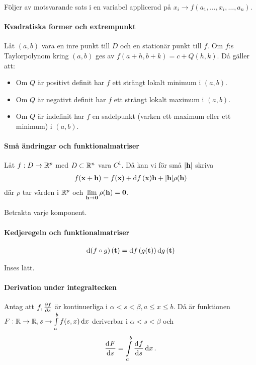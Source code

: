 \proof
Följer av motsvarande sats i en variabel applicerad på $x_i\to f(a_1, \dots, x_i, \dots, a_n)$.

\paragraph{Kvadratiska former och extrempunkt}
Låt $(a, b)$ vara en inre punkt till $D$ och en stationär punkt till $f$. Om $f$:s Taylorpolynom kring $(a, b)$ ges av $f(a + h, b + k) = c + Q(h, k)$. Då gäller att:
\begin{itemize}
	\item Om $Q$ är positivt definit har $f$ ett strängt lokalt minimum i $(a, b)$.
	\item Om $Q$ är negativt definit har $f$ ett strängt lokalt maximum i $(a, b)$.
	\item Om $Q$ är indefinit har $f$ en sadelpunkt (varken ett maximum eller ett minimum) i $(a, b)$.
\end{itemize}

\paragraph{Små ändringar och funktionalmatriser}
Låt $f:D\to\mathbb{R}^p$ med $D\subset\mathbb{R}^n$ vara $C^1$. Då kan vi för små $\abs{\vect{h}}$ skriva
\begin{align*}
	f(\vect{x} + \vect{h}) = f(\vect{x}) + \dd{f} (\vect{x})\vect{h} + \abs{\vect{h}}\rho (\vect{h})
\end{align*}
där $\rho$ tar värden i $\mathbb{R}^p$ och $\limit{\vect{h}}{\vect{0}}\rho (\vect{h}) = \vect{0}$.

\proof
Betrakta varje komponent.

\paragraph{Kedjeregeln och funktionalmatriser}
\begin{align*}
	\dd{(f\circ g)} (\vect{t}) = \dd{f} (g(\vect{t}))\dd{g} (\vect{t})
\end{align*}

\proof
Inses lätt.

\paragraph{Derivation under integraltecken}
Antag att $f, \pdv{f}{s}$ är kontinuerliga i $\alpha < s < \beta, a\leq x\leq b$. Då är funktionen $F:\mathbb{R}\to\mathbb{R}, s\to\int\limits_{a}^{b}f(s, x)\dd{x}$ deriverbar i $\alpha < s < \beta$ och
\begin{align*}
	\dv[]{F}{s} (s) = \int\limits_{a}^{b}\dv[]{f}{s} (s, x)\dd{x}.
\end{align*}

